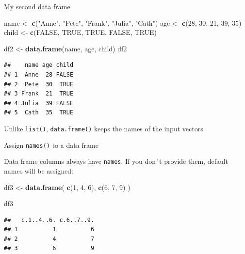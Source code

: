 \documentclass[ignorenonframetext,]{beamer}
\newenvironment{Shaded}{\begin{snugshade}}{\end{snugshade}}
\newcommand{\DecValTok}[1]{\textcolor[rgb]{0.00,0.00,0.81}{#1}}
\newcommand{\KeywordTok}[1]{\textcolor[rgb]{0.13,0.29,0.53}{\textbf{#1}}}
\newcommand{\NormalTok}[1]{#1}
\newcommand{\OtherTok}[1]{\textcolor[rgb]{0.56,0.35,0.01}{#1}}
\newcommand{\StringTok}[1]{\textcolor[rgb]{0.31,0.60,0.02}{#1}}
\begin{document}
\begin{frame}[fragile]{My second data frame}
\protect\hypertarget{my-second-data-frame}{}

\begin{Shaded}
\begin{Highlighting}[]
\NormalTok{name <-}\StringTok{ }\KeywordTok{c}\NormalTok{(}\StringTok{"Anne"}\NormalTok{, }\StringTok{"Pete"}\NormalTok{, }\StringTok{"Frank"}\NormalTok{, }\StringTok{"Julia"}\NormalTok{, }\StringTok{"Cath"}\NormalTok{)}
\NormalTok{age <-}\StringTok{ }\KeywordTok{c}\NormalTok{(}\DecValTok{28}\NormalTok{, }\DecValTok{30}\NormalTok{, }\DecValTok{21}\NormalTok{, }\DecValTok{39}\NormalTok{, }\DecValTok{35}\NormalTok{)}
\NormalTok{child <-}\StringTok{ }\KeywordTok{c}\NormalTok{(}\OtherTok{FALSE}\NormalTok{, }\OtherTok{TRUE}\NormalTok{, }\OtherTok{TRUE}\NormalTok{, }\OtherTok{FALSE}\NormalTok{, }\OtherTok{TRUE}\NormalTok{)}

\NormalTok{df2 <-}\StringTok{ }\KeywordTok{data.frame}\NormalTok{(name, age, child)}
\NormalTok{df2}
\end{Highlighting}
\end{Shaded}

\begin{verbatim}
##    name age child
## 1  Anne  28 FALSE
## 2  Pete  30  TRUE
## 3 Frank  21  TRUE
## 4 Julia  39 FALSE
## 5  Cath  35  TRUE
\end{verbatim}

Unlike \texttt{list()}, \texttt{data.frame()} keeps the names of the
input vectors

\end{frame}

\begin{frame}[fragile]{Assign \texttt{names()} to a data frame}
\protect\hypertarget{assign-names-to-a-data-frame}{}

Data frame columns always have \texttt{names}. If you don´t provide
them, default names will be assigned:

\begin{Shaded}
\begin{Highlighting}[]
\NormalTok{df3 <-}\StringTok{ }\KeywordTok{data.frame}\NormalTok{(}
  \KeywordTok{c}\NormalTok{(}\DecValTok{1}\NormalTok{, }\DecValTok{4}\NormalTok{, }\DecValTok{6}\NormalTok{),}
  \KeywordTok{c}\NormalTok{(}\DecValTok{6}\NormalTok{, }\DecValTok{7}\NormalTok{, }\DecValTok{9}\NormalTok{)}
\NormalTok{) }

\NormalTok{df3}
\end{Highlighting}
\end{Shaded}

\begin{verbatim}
##   c.1..4..6. c.6..7..9.
## 1          1          6
## 2          4          7
## 3          6          9
\end{verbatim}

\end{frame}
\end{document}
